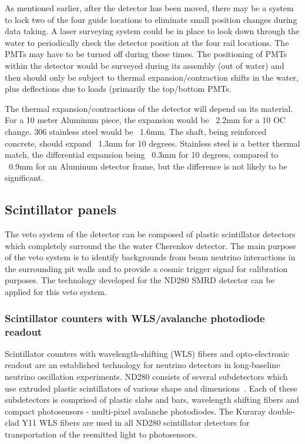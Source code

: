 As mentioned earlier, after the detector has been moved,
 there may be a system to lock two of the four guide locations to eliminate small position
 changes during data taking. A laser surveying system could be in place to look down through the
 water to periodically check the detector position at the four rail locations. The PMTs may have
 to be turned off during these times. The positioning of PMTs within the detector would be surveyed
 during its assembly (out of water) and then should only be subject to thermal expansion/contraction
 shifts in the water, plus deflections due to loads (primarily the top/bottom PMTs.

The thermal
 expansion/contractions of the detector will depend on its material. For a 10 meter Aluminum piece,
 the expansion would be ~2.2mm for a 10 OC change. 306 stainless steel would be ~1.6mm. The shaft, being reinforced concrete, should expand ~1.3mm for 10 degrees. Stainless steel is
 a better thermal match, the differential expansion being ~0.3mm for 10 degrees, compared to ~0.9mm 
for an Aluminum detector frame, but the difference is not likely to be significant.


\subsection{Scintillator panels}\label{sec:scint}

The veto system of the \nuprism detector can be composed of plastic scintillator detectors which completely surround the the water Cherenkov detector. The main purpose of the veto system is to identify backgrounds from beam neutrino interactions in the surrounding pit walls  and to provide a cosmic trigger signal for calibration purposes. The technology developed for the ND280 SMRD detector can be applied for this veto system.

\subsubsection{Scintillator counters with WLS/avalanche photodiode readout}

Scintillator counters with wavelength-shifting (WLS) fibers and opto-electronic readout are an established technology for neutrino detectors in  long-baseline neutrino oscillation experiments. ND280 consists of several subdetectors which use extruded plastic scintillators of various shape and dimensions~\cite{nd280}. Each of these subdetectors is comprised of plastic slabs and bars, wavelength shifting fibers and compact photosensors - multi-pixel avalanche photodiodes. The Kuraray  double-clad Y11 WLS fibers are used in all ND280 scintillator detectors for transportation of the reemitted light to photosensors.  


